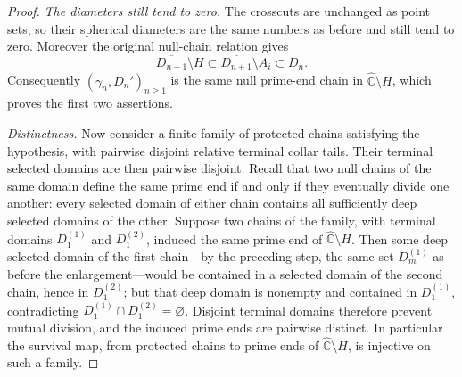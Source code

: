 \documentclass[11pt,reqno]{amsart}
\theoremstyle{definition}
\theoremstyle{remark}
\newcommand{\Chat}{\widehat{\mathbb C}}
\begin{document}
\begin{proof}
\emph{The diameters still tend to zero.}
The crosscuts are unchanged as point sets, so their spherical diameters
are the same numbers as before and still tend to zero.  Moreover the
original null-chain relation gives
\[
 \overline{D_{n+1}}\setminus H
 \subset\overline{D_{n+1}}\setminus A_i
 \subset D_n.
\]
Consequently $(\gamma_n,D_n')_{n\ge1}$ is the same null prime-end chain in
$\Chat\setminus H$,
which proves the first two assertions.

\emph{Distinctness.}
Now consider a finite family of protected chains satisfying the
hypothesis, with pairwise disjoint relative terminal collar tails.  Their
terminal selected domains are then pairwise disjoint.  Recall
that two null chains of the same domain define the same prime end if and
only if they eventually divide one another: every selected domain of
either chain contains all sufficiently deep selected domains of the
other.  Suppose two chains of the family, with terminal domains
$D_1^{(1)}$ and $D_1^{(2)}$, induced the same prime end of
$\Chat\setminus H$.  Then some deep selected domain of the first
chain---by the preceding step, the same set $D_m^{(1)}$ as before the
enlargement---would be contained in a selected domain of the second
chain, hence in $D_1^{(2)}$; but that deep domain is nonempty and
contained in $D_1^{(1)}$, contradicting
$D_1^{(1)}\cap D_1^{(2)}=\varnothing$.  Disjoint terminal domains
therefore prevent mutual division, and the induced prime ends are
pairwise distinct.  In particular the survival map, from protected
chains to prime ends of $\Chat\setminus H$, is injective on such a
family.


\end{proof}
\end{document}
